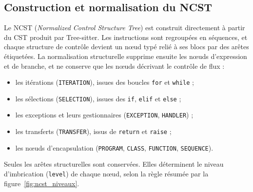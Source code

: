 {\subsection{Construction et normalisation du NCST}

Le NCST (\emph{Normalized Control Structure Tree}) est construit directement
à partir du CST produit par Tree-sitter. Les instructions sont regroupées en
séquences, et chaque structure de contrôle devient un nœud typé relié à ses
blocs par des arêtes étiquetées. La normalisation structurelle supprime
ensuite les nœuds d'expression et de branche, et ne conserve que les nœuds
décrivant le contrôle de flux :

\begin{itemize}
    \item les itérations (\texttt{ITERATION}), issues des boucles
    \texttt{for} et \texttt{while} ;
    \item les sélections (\texttt{SELECTION}), issues des \texttt{if},
    \texttt{elif} et \texttt{else} ;
    \item les exceptions et leurs gestionnaires (\texttt{EXCEPTION},
    \texttt{HANDLER}) ;
    \item les transferts (\texttt{TRANSFER}), issus de \texttt{return} et
    \texttt{raise} ;
    \item les nœuds d'encapsulation (\texttt{PROGRAM}, \texttt{CLASS},
    \texttt{FUNCTION}, \texttt{SEQUENCE}).
\end{itemize}

Seules les arêtes structurelles sont conservées. Elles déterminent le niveau
d'imbrication (\texttt{level}) de chaque nœud, selon la règle résumée par la
figure~\ref{fig:ncst_niveaux}.

}
